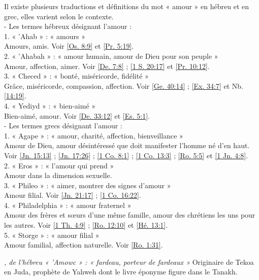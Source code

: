 \begin{multicols}{2}
\textit{}\newline
Il existe plusieurs traductions et définitions du mot « amour » en hébreu et en grec, elles varient selon le contexte.
\\- Les termes hébreux désignant l'amour :
\\1. « 'Ahab » : « amours »
\\Amours, amis. Voir \vref{Os. 8:9} et \vref{Pr. 5:19}.
\\2. « 'Ahabah » : « amour humain, amour de Dieu pour son peuple »
\\Amour, affection, aimer. Voir \vref{De. 7:8} ; \vref{1 S. 20:17} et \vref{Pr. 10:12}.
\\3. « Checed » : « bonté, miséricorde, fidélité »
\\Grâce, miséricorde, compassion, affection. Voir \vref{Ge. 40:14} ; \vref{Ex. 34:7} et Nb. \vref{14:19}.
\\4. « Yediyd » : « bien-aimé »
\\Bien-aimé, amour. Voir \vref{De. 33:12} et \vref{Es. 5:1}.
\\- Les termes grecs désignant l'amour :
\\1. « Agape » : « amour, charité, affection, bienveillance »
\\Amour de Dieu, amour désintéressé que doit manifester l'homme né d'en haut. Voir \vref{Jn. 15:13} ; \vref{Jn. 17:26} ; \vref{1 Co. 8:1} ; \vref{1 Co. 13:3} ; \vref{Ro. 5:5} et \vref{1 Jn. 4:8}.
\\2. « Eros » : « l'amour qui prend »
\\Amour dans la dimension sexuelle.
\\3. « Phileo » : « aimer, montrer des signes d'amour »
\\Amour filial. Voir \vref{Jn. 21:17} ; \vref{1 Co. 16:22}.
\\4. « Philadelphia » : « amour fraternel »
\\Amour des frères et sœurs d'une même famille, amour des chrétiens les uns pour les autres. Voir \vref{1 Th. 4:9} ; \vref{Ro. 12:10} et \vref{Hé. 13:1}.
\\5. « Storge » : « amour filial »
\\Amour familial, affection naturelle. Voir \vref{Ro. 1:31}.

\textit{, de l'hébreu « 'Amowc » : « fardeau, porteur de fardeaux »}\newline
Originaire de Tekoa en Juda, prophète de Yahweh dont le livre éponyme figure dans le Tanakh.


\end{multicols}
